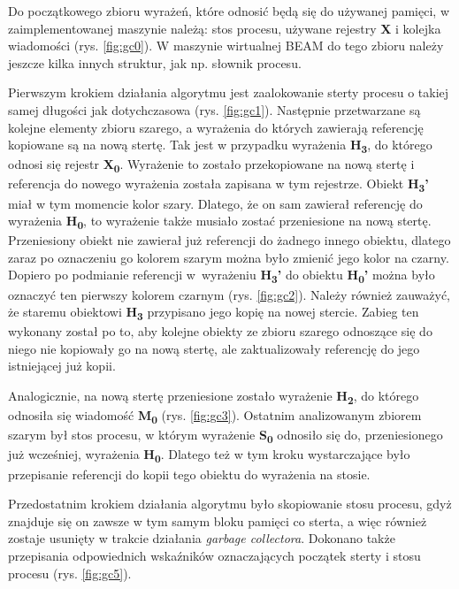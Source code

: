 Do początkowego zbioru wyrażeń, które odnosić będą się do używanej pamięci, w zaimplementowanej maszynie należą:
stos procesu, używane rejestry \textbf{X} i kolejka wiadomości (rys. \ref{fig:gc0}). W maszynie wirtualnej BEAM do tego zbioru należy jeszcze kilka innych struktur, jak np. słownik procesu.

Pierwszym krokiem działania algorytmu jest zaalokowanie sterty procesu o takiej samej długości jak dotychczasowa (rys. \ref{fig:gc1}).
Następnie przetwarzane są kolejne elementy zbioru szarego, a wyrażenia do których zawierają referencję kopiowane są na nową stertę.
Tak jest w przypadku wyrażenia \textbf{H\textsubscript{3}}, do którego odnosi się rejestr \textbf{X\textsubscript{0}}.
Wyrażenie to zostało przekopiowane na nową stertę i referencja do nowego wyrażenia została zapisana w tym rejestrze.
Obiekt \textbf{H\textsubscript{3}'} miał w tym momencie kolor szary.
Dlatego, że on sam zawierał referencję do wyrażenia \textbf{H\textsubscript{0}}, to wyrażenie także musiało zostać przeniesione na nową stertę.
Przeniesiony obiekt nie zawierał już referencji do żadnego innego obiektu, dlatego zaraz po oznaczeniu go kolorem szarym można było zmienić jego kolor na czarny.
Dopiero po podmianie referencji w~wyrażeniu \textbf{H\textsubscript{3}'} do obiektu \textbf{H\textsubscript{0}'} można było oznaczyć ten pierwszy kolorem czarnym (rys. \ref{fig:gc2}).
Należy również zauważyć, że staremu obiektowi \textbf{H\textsubscript{3}} przypisano jego kopię na nowej stercie.
Zabieg ten wykonany został po to, aby kolejne obiekty ze zbioru szarego odnoszące się do niego nie kopiowały go na nową stertę, ale zaktualizowały referencję do jego istniejącej już kopii.

Analogicznie, na nową stertę przeniesione zostało wyrażenie \textbf{H\textsubscript{2}}, do którego odnosiła się wiadomość \textbf{M\textsubscript{0}} (rys. \ref{fig:gc3}).
Ostatnim analizowanym zbiorem szarym był stos procesu, w którym wyrażenie \textbf{S\textsubscript{0}} odnosiło się do, przeniesionego już wcześniej, wyrażenia \textbf{H\textsubscript{0}}. Dlatego też w tym kroku wystarczające było przepisanie referencji do kopii tego obiektu do wyrażenia na stosie.

Przedostatnim krokiem działania algorytmu było skopiowanie stosu procesu, gdyż znajduje się on zawsze w tym samym bloku pamięci co sterta, a więc również zostaje usunięty w trakcie działania \emph{garbage collectora}.
Dokonano także przepisania odpowiednich wskaźników oznaczających początek sterty i stosu procesu (rys. \ref{fig:gc5}).

